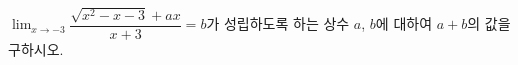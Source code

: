 $\displaystyle\lim_{x\to -3}\dfrac{\sqrt{x^2-x-3}+ax}{x+3}=b$가 성립하도록 하는 상수 $a$, $b$에 대하여 $a+b$의 값을 구하시오.
